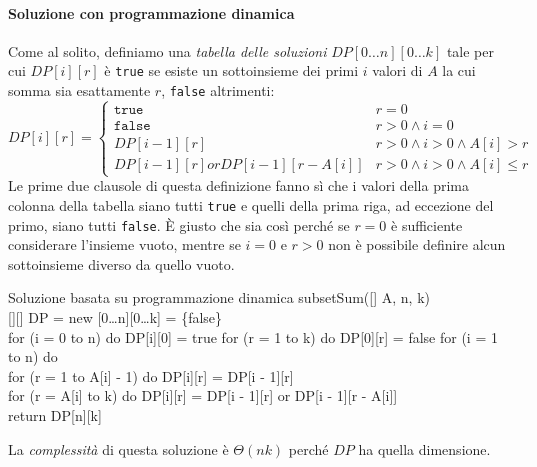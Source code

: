 \paragraph{Soluzione con programmazione dinamica}
Come al solito, definiamo una \emph{tabella delle soluzioni}
$DP[0\dots n][0\dots k]$ tale per cui $DP[i][r]$ è \texttt{true} se esiste un
sottoinsieme dei primi $i$ valori di $A$ la cui somma sia esattamente $r$,
\texttt{false} altrimenti:
\[DP[i][r]=\begin{cases}
    \texttt{true} & r=0\\
    \texttt{false} & r>0\wedge i=0\\
    DP[i-1][r] & r>0\wedge i>0\wedge A[i]>r\\
    DP[i-1][r] or DP[i-1][r-A[i]] & r>0\wedge i>0\wedge A[i]\leq r
\end{cases}\]
Le prime due clausole di questa definizione fanno sì che i valori della prima
colonna della tabella siano tutti \texttt{true} e quelli della prima riga, ad
eccezione del primo, siano tutti \texttt{false}. È giusto che sia così perché
se $r=0$ è sufficiente considerare l'insieme vuoto, mentre se $i=0$ e $r>0$
non è possibile definire alcun sottoinsieme diverso da quello vuoto.

\begin{minicode}{Soluzione basata su programmazione dinamica}
\ind{} subsetSum([] A,  n,  k)\\
    [][] DP = new [0\dots n][0\dots k] = \{false\}\\
    \indf for (i = 0 to n) do\hfill{}
        DP[i][0] = true\hfill{}
    \indf for (r = 1 to k) do\hfill{}
        DP[0][r] = false\hfill{}
    \indf for (i = 1 to n) do\\
        \indff for (r = 1 to A[i] - 1) do\hfill{}
            DP[i][r] = DP[i - 1][r]\\
        \indff for (r = A[i] to k) do\hfill{}
            DP[i][r] = DP[i - 1][r] or DP[i - 1][r - A[i]]\\
    \indf return DP[n][k]
\end{minicode}
\noindent
La \emph{complessità} di questa soluzione è $\Theta(nk)$ perché $DP$ ha quella
dimensione.

